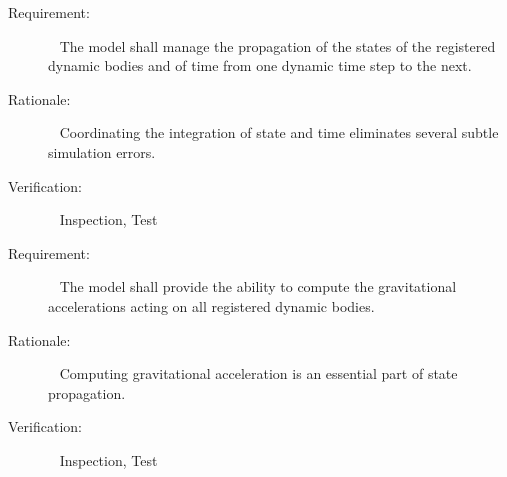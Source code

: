 \label{reqt:integration}
\begin{description}
\item[Requirement:]\ \newline
  The model shall manage the propagation of the states of the registered
  dynamic bodies and of time from one dynamic time step to the next.
\item[Rationale:]\ \newline
  Coordinating the integration of state and time eliminates several
  subtle simulation errors.
\item[Verification:]\ \newline
  Inspection, Test
\end{description}


\label{reqt:gravitation}
\begin{description}
\item[Requirement:]\ \newline
  The model shall provide the ability to compute the gravitational
  accelerations acting on all registered dynamic bodies.
\item[Rationale:]\ \newline
  Computing gravitational acceleration is an
  essential part of state propagation.
\item[Verification:]\ \newline
  Inspection, Test
\end{description}
